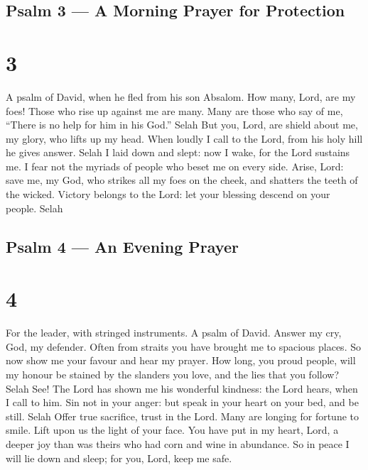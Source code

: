 \hypertarget{psalm-3-a-morning-prayer-for-protection}{%
\subsection{Psalm 3 --- A Morning Prayer for
Protection}\label{psalm-3-a-morning-prayer-for-protection}}

\hypertarget{section-2}{%
\section{3}\label{section-2}}

A psalm of David, when he fled from his son Absalom.  How
many, Lord, are my foes! Those who rise up against me are many.
 Many are those who say of me, ``There is no help for him in
his God.'' Selah  But you, Lord, are shield about me, my
glory, who lifts up my head.  When loudly I call to the
Lord, from his holy hill he gives answer. Selah  I laid down
and slept: now I wake, for the Lord sustains me.  I fear not
the myriads of people who beset me on every side.  Arise,
Lord: save me, my God, who strikes all my foes on the cheek, and
shatters the teeth of the wicked.  Victory belongs to the
Lord: let your blessing descend on your people. Selah

\hypertarget{psalm-4-an-evening-prayer}{%
\subsection{Psalm 4 --- An Evening
Prayer}\label{psalm-4-an-evening-prayer}}

\hypertarget{section-3}{%
\section{4}\label{section-3}}

For the leader, with stringed instruments. A psalm of David.
 Answer my cry, God, my defender. Often from straits you
have brought me to spacious places. So now show me your favour and hear
my prayer.  How long, you proud people, will my honour be
stained by the slanders you love, and the lies that you follow? Selah
 See! The Lord has shown me his wonderful kindness: the Lord
hears, when I call to him.  Sin not in your anger: but speak
in your heart on your bed, and be still. Selah  Offer true
sacrifice, trust in the Lord.  Many are longing for fortune
to smile. Lift upon us the light of your face.  You have put
in my heart, Lord, a deeper joy than was theirs who had corn and wine in
abundance.  So in peace I will lie down and sleep; for you,
Lord, keep me safe.

